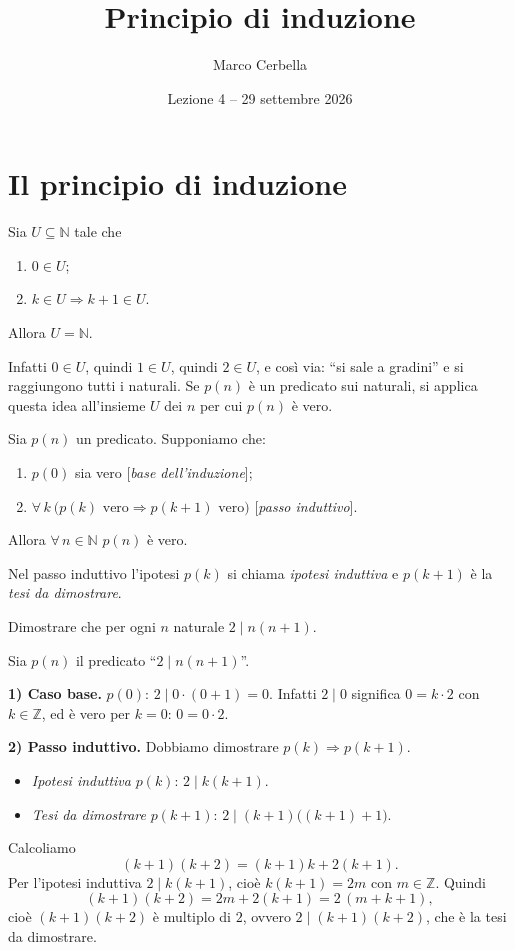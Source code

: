 \documentclass[11pt,a4paper]{article}
\title{Principio di induzione}
\author{Marco Cerbella}
\date{Lezione 4 -- 29 settembre 2026}
\begin{document}
\maketitle

\section{Il principio di induzione}

\begin{osservazione}
Sia $U \subseteq \mathbb{N}$ tale che
\begin{enumerate}
    \item $0 \in U$;
    \item $k \in U \Rightarrow k + 1 \in U$.
\end{enumerate}
Allora $U = \mathbb{N}$.
\end{osservazione}

Infatti $0 \in U$, quindi $1 \in U$, quindi $2 \in U$, e così via: ``si sale
a gradini'' e si raggiungono tutti i naturali. Se $p(n)$ è un predicato
sui naturali, si applica questa idea all'insieme $U$ dei $n$ per cui
$p(n)$ è vero.

\begin{teorema}
Sia $p(n)$ un predicato. Supponiamo che:
\begin{enumerate}
    \item $p(0)$ sia vero \hfill [\emph{base dell'induzione}];
    \item $\forall\, k \ \big(p(k) \text{ vero} \Rightarrow p(k+1)
          \text{ vero}\big)$ \hfill [\emph{passo induttivo}].
\end{enumerate}
Allora $\forall\, n \in \mathbb{N}$ $p(n)$ è vero.
\end{teorema}

Nel passo induttivo l'ipotesi $p(k)$ si chiama \emph{ipotesi induttiva} e
$p(k+1)$ è la \emph{tesi da dimostrare}.

\begin{esempio}
Dimostrare che per ogni $n$ naturale $2 \mid n(n+1)$.

Sia $p(n)$ il predicato ``$2 \mid n(n+1)$''.

\textbf{1) Caso base.} $p(0)$: $2 \mid 0 \cdot (0 + 1) = 0$. Infatti
$2 \mid 0$ significa $0 = k \cdot 2$ con $k \in \mathbb{Z}$, ed è vero per
$k = 0$: $0 = 0 \cdot 2$.

\textbf{2) Passo induttivo.} Dobbiamo dimostrare $p(k) \Rightarrow
p(k+1)$.
\begin{itemize}
    \item \emph{Ipotesi induttiva} $p(k)$: $2 \mid k(k+1)$.
    \item \emph{Tesi da dimostrare} $p(k+1)$: $2 \mid (k+1)\big((k+1)+1\big)$.
\end{itemize}
Calcoliamo
\[
(k+1)(k+2) = (k+1)k + 2(k+1).
\]
Per l'ipotesi induttiva $2 \mid k(k+1)$, cioè $k(k+1) = 2m$ con
$m \in \mathbb{Z}$. Quindi
\[
(k+1)(k+2) = 2m + 2(k+1) = 2\,(m + k + 1),
\]
cioè $(k+1)(k+2)$ è multiplo di $2$, ovvero $2 \mid (k+1)(k+2)$, che è la
tesi da dimostrare.
\end{esempio}
\end{document}
